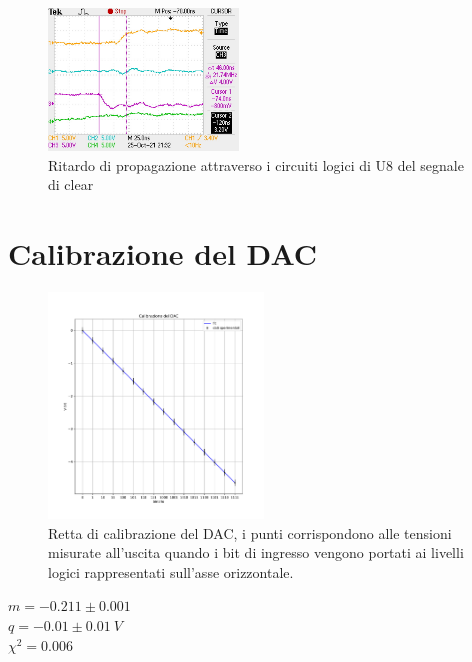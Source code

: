 \documentclass[journal]{IEEEtran}
\begin{document}
\begin{figure}[H]%
\begin{center}
\includegraphics[width=0.45\textwidth]{data-source/25-10-21/DeltaT-clear.JPG}
\caption{Ritardo di propagazione attraverso i circuiti logici di U8 del segnale di clear}
\label{fig:inverter_ring_xy}
\end{center}
\end{figure}


\section{Calibrazione del DAC}

\begin{figure}[t]%
\centering
\begin{center}
\includegraphics[width=0.51\textwidth]{analysis/output/calibrazione_dac.pdf}
\end{center}
\caption{Retta di calibrazione del DAC, i punti corrispondono alle tensioni misurate all'uscita quando i bit di ingresso vengono portati ai livelli logici rappresentati sull'asse orizzontale.}
\label{fig:graph_calibrazione_dac}
\end{figure}

$ m = -0.211 \pm 0.001 $ \\
$ q = -0.01 \pm 0.01 \ V $ \\
$ \chi^{2} = 0.006 $ \\
\end{document}
